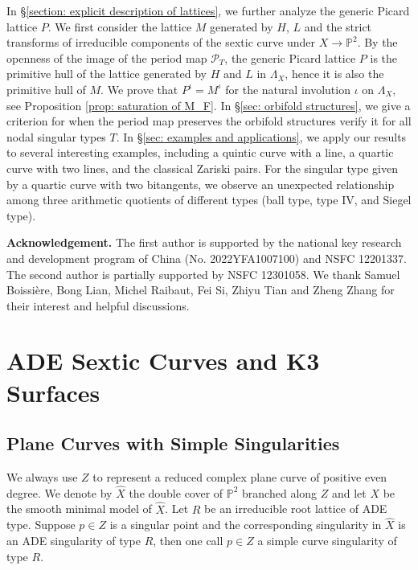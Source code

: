 \documentclass[12pt,reqno,a4paper]{amsart}
\theoremstyle{remark}
\theoremstyle{definition}
\begin{document}
 


In \S \ref{section: explicit description of lattices}, we further analyze the generic Picard lattice $P$. 
We first consider the lattice $M$ generated by $H$, $L$ and the strict transforms of irreducible components of the sextic curve under $X\to \mathbb{P}^2$. By the openness of the image of the period map $\mathscr{P}_T$, the generic Picard lattice $P$ is the primitive hull of the lattice generated by $H$ and $L$ in $\Lambda_X$, hence it is also the primitive hull of $M$. We prove that $P^\iota=M^\iota$ for the natural involution $\iota$ on $\Lambda_X$, see Proposition \ref{prop: saturation of M_F}.
In \S \ref{sec: orbifold structures}, we give a criterion for when the period map preserves the orbifold structures verify it for all nodal singular types $T$.
In \S \ref{sec: examples and applications}, we apply our results to several interesting examples, including a quintic curve with a line, a quartic curve with two lines, and the classical Zariski pairs. For the singular type given by a quartic curve with two bitangents, we observe an unexpected relationship among three arithmetic quotients of different types (ball type, type IV, and Siegel type).


\textbf{Acknowledgement.}
The first author is supported by the national key research and development program of China (No. 2022YFA1007100) and NSFC 12201337. The second author is partially supported by NSFC 12301058. We thank Samuel Boissi\`{e}re, Bong Lian, Michel Raibaut, Fei Si, Zhiyu Tian and Zheng Zhang for their interest and helpful discussions. 


\section{ADE Sextic Curves and K3 Surfaces}
\label{section: K3}

\subsection{Plane Curves with Simple Singularities}
\label{subsection: ADE sextic}
We always use $Z$ to represent a reduced complex plane curve of positive even degree. We denote by $\widehat{X}$ the double cover of $\mathbb{P}^2$ branched along $Z$ and let $X$ be the smooth minimal model of $\widehat{X}$. Let $R$ be an irreducible root lattice of ADE type. Suppose $p\in Z$ is a singular point and the corresponding singularity in $\widehat{X}$ is an ADE singularity of type $R$, then one call $p\in Z$ a simple curve singularity of type $R$. 
\end{document}
